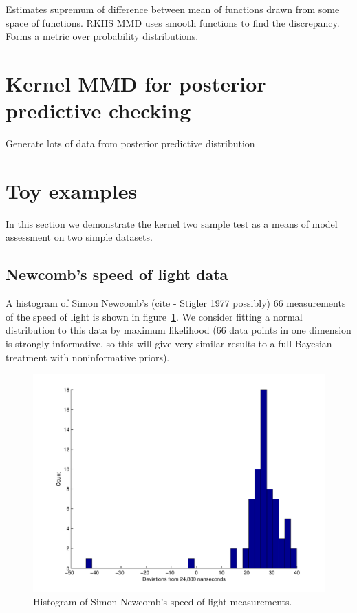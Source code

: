 \documentclass{article}
\begin{document}
Estimates supremum of difference between mean of functions drawn from some space of functions.
RKHS MMD uses smooth functions to find the discrepancy.
Forms a metric over probability distributions.

\section{Kernel MMD for posterior predictive checking}

Generate lots of data from posterior predictive distribution

\section{Toy examples}

In this section we demonstrate the kernel two sample test as a means of model assessment on two simple datasets.

\subsection{Newcomb's speed of light data}

A histogram of Simon Newcomb's (cite - Stigler 1977 possibly) 66 measurements of the speed of light is shown in figure~\ref{fig:newcomb_hist}.
We consider fitting a normal distribution to this data by maximum likelihood (66 data points in one dimension is strongly informative, so this will give very similar results to a full Bayesian treatment with noninformative priors).

\begin{figure}[ht]
\centering
\includegraphics[width=0.98\columnwidth]{figures/newcomb_hist}
\caption{
Histogram of Simon Newcomb's speed of light measurements.
}
\label{fig:newcomb_hist}
\end{figure}
\end{document}

